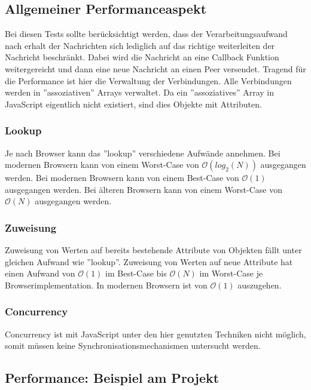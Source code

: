\subsection{Allgemeiner Performanceaspekt} \label{associativearray}
Bei diesen Tests sollte berücksichtigt werden, dass der Verarbeitungsaufwand nach erhalt der Nachrichten sich lediglich auf das richtige weiterleiten der Nachricht beschränkt. 
Dabei wird die Nachricht an eine Callback Funktion weitergereicht und dann eine neue Nachricht an einen Peer versendet. 
Tragend für die Performance ist hier die Verwaltung der Verbindungen.
Alle Verbindungen werden in ''assoziativen'' Arrays verwaltet. Da ein ''assoziatives'' Array in JavaScript eigentlich nicht existiert, sind dies Objekte mit Attributen. 



\subsubsection{Lookup}
Je nach Browser kann das ''lookup'' verschiedene Aufwände annehmen.
Bei modernen Browsern kann von einem Worst-Case von 
\(
\mathcal O\left( log_{ 2 }\left( N \right) \right) 
\)
ausgegangen werden.
Bei modernen Browsern kann von einem Best-Case von 
\(
\mathcal O\left( 1 \right) 
\)
ausgegangen werden.
Bei älteren Browsern kann von einem Worst-Case von 
\(
\mathcal O\left( N \right) 
\)
ausgegangen werden.



\subsubsection{Zuweisung}
Zuweisung von Werten auf bereits bestehende Attribute von Objekten fällt unter gleichen Aufwand wie ''lookup''.
Zuweisung von Werten auf neue Attribute hat einen Aufwand von 
\(
\mathcal O\left( 1 \right) 
\)
im Best-Case bis 
\(
\mathcal O\left( N \right) 
\)
im Worst-Case je Browserimplementation. In modernen Browsern ist von 
\(
\mathcal O\left( 1 \right)
\)
auszugehen.



\subsubsection{Concurrency}
Concurrency ist mit JavaScript unter den hier genutzten Techniken nicht möglich, somit müssen keine Synchronisationsmechanismen untersucht werden.




\subsection{Performance: Beispiel am Projekt}

